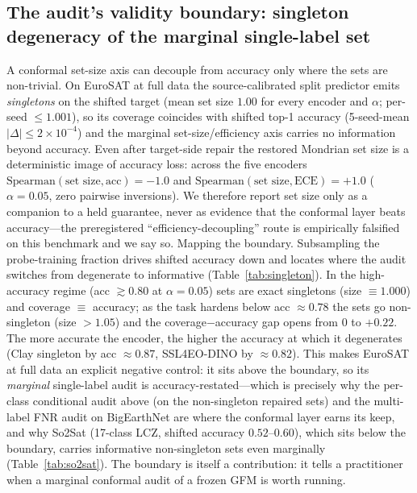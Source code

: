 \documentclass[11pt]{article}
\begin{document}
\subsection*{The audit's validity boundary: singleton degeneracy of the marginal single-label set}
A conformal set-size axis can decouple from accuracy only where the sets are non-trivial. On EuroSAT at
full data the source-calibrated split predictor emits \emph{singletons} on the shifted target (mean set
size $1.00$ for every encoder and $\alpha$; per-seed $\le1.001$), so its coverage coincides with shifted
top-1 accuracy (5-seed-mean $|\Delta|\le2\times10^{-4}$) and the marginal set-size/efficiency axis carries
no information beyond accuracy. Even after target-side repair the restored Mondrian set size is a
deterministic image of accuracy loss: across the five encoders $\mathrm{Spearman}(\text{set size},\text{acc})=-1.0$
and $\mathrm{Spearman}(\text{set size},\text{ECE})=+1.0$ ($\alpha{=}0.05$, zero pairwise inversions). We
therefore report set size only as a companion to a held guarantee, never as evidence that the conformal
layer beats accuracy---the preregistered ``efficiency-decoupling'' route is empirically falsified on this
benchmark and we say so.
Mapping the boundary. Subsampling the probe-training fraction drives shifted accuracy down and
locates where the audit switches from degenerate to informative (Table~\ref{tab:singleton}). In the
high-accuracy regime (acc $\gtrsim0.80$ at $\alpha{=}0.05$) sets are exact singletons (size $\equiv1.000$)
and coverage $\equiv$ accuracy; as the task hardens below acc $\approx0.78$ the sets go non-singleton
(size $>1.05$) and the coverage$-$accuracy gap opens from $0$ to $+0.22$. The more accurate the encoder,
the higher the accuracy at which it degenerates (Clay singleton by acc $\approx0.87$, SSL4EO-DINO by
$\approx0.82$). This makes EuroSAT at full data an explicit negative control: it sits above
the boundary, so its \emph{marginal} single-label audit is accuracy-restated---which is precisely why the
per-class conditional audit above (on the non-singleton repaired sets) and the multi-label FNR audit
on BigEarthNet are where the conformal layer earns its keep, and why So2Sat (17-class LCZ, shifted accuracy
$0.52$--$0.60$), which sits below the boundary, carries informative non-singleton sets even
marginally (Table~\ref{tab:so2sat}). The boundary is itself a contribution: it tells a practitioner when a
marginal conformal audit of a frozen GFM is worth running.
\end{document}
